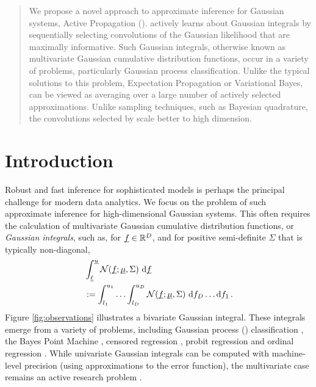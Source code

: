 \documentclass[twoside]{article}
\begin{document}

\begin{abstract}%
We propose a novel approach to approximate inference for Gaussian systems, Active Propagation (\ap). \ap actively learns about Gaussian integrals by sequentially selecting convolutions of the Gaussian likelihood that are maximally informative. Such Gaussian integrals, otherwise known as multivariate Gaussian cumulative distribution functions, occur in a variety of problems, particularly Gaussian process classification. Unlike the typical solutions to this problem, Expectation Propagation or Variational Bayes, \ap can be viewed as averaging over a large number of actively selected approximations. Unlike sampling techniques, such as Bayesian quadrature, the convolutions selected by \ap scale better to high dimension. 
\end{abstract}


\section{Introduction}

Robust and fast inference for sophisticated models is perhaps the principal challenge for modern data analytics. We focus on the problem of such approximate inference for high-dimensional Gaussian systems. This often requires the calculation of multivariate Gaussian cumulative distribution functions, or \emph{Gaussian integrals}, such as, for $\underline{\smash{f}}\in\mathbb{R}^D$, and for positive semi-definite $\Sigma$ that is typically non-diagonal,
\begin{align}\label{eq:GI}
& \int_{\underline{\smash{\ell}}}^{\underline{\smash{u}}} \mathcal{N}(\underline{\smash{f}};\underline{\smash{\mu}},\Sigma)~\mathrm{d} \underline{\smash{f}}\nonumber\\
& := \int_{l_1}^{u_1}\ldots\int_{l_D}^{u_D} \mathcal{N}(\underline{\smash{f}};\underline{\smash{\mu}},\Sigma)~\mathrm{d} f_D \ldots \mathrm{d} f_1\,.
\end{align}
Figure \ref{fig:observations} illustrates a bivariate Gaussian integral. These integrals emerge from a variety of problems, including Gaussian process (\gp) classification \citep{GpsBook}, the Bayes Point Machine \citep{herbrich2001bayes}, censored regression \citep{ertin2007gaussian}, probit regression \citep{ochi1984likelihood} and ordinal regression \citep{chu2005gaussian}. While univariate Gaussian integrals can be computed with machine-level precision (using approximations to the error function), the multivariate case remains an active research problem \citep{cunningham2011approximate}. 
\end{document}
